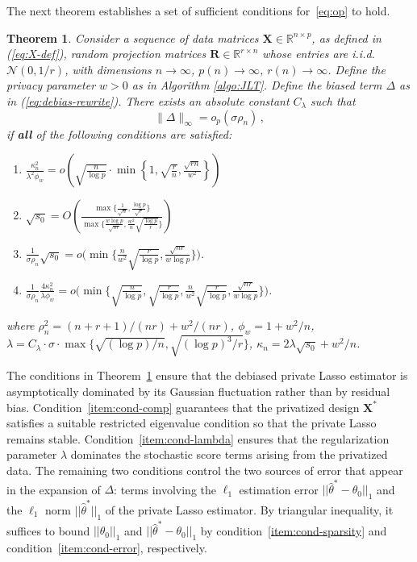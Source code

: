 \documentclass[11pt]{article}
\newtheorem{theorem}{Theorem}%
\newcommand{\bX}{\boldsymbol{X}}
\newcommand{\bR}{\boldsymbol{R}}
\newcommand{\mbR}{\mathbb{R}}
\newcommand{\mcN}{\mathcal{N}}
\begin{document}
The next theorem establishes a set of sufficient conditions for~\eqref{eq:op} to hold.
\begin{theorem}\label{thm:suff-cond-debiasing}
Consider a sequence of data matrices $\bX\in\mbR^{n\times p}$, as defined in (\ref{eq:X-def}), random projection matrices $\bR\in\mbR^{r\times n}$ whose entries are i.i.d. $\mcN(0,1/r)$, with dimensions $n\to\infty$, $p(n)\to\infty$, $r(n)\to \infty$. Define the privacy parameter $w>0$ as in Algorithm \ref{algo:JLT}. Define the biased term $\Delta$ as in (\ref{eq:debias-rewrite}). There exists an absolute constant $C_\lambda$ such that 
\[\|\Delta\|_\infty = o_p(\sigma\rho_n)\,,\] 
if \textbf{all} of the following conditions are satisfied:
    \begin{enumerate}
    \item $\frac{\kappa_n^2}{\lambda^2\phi_w}=o\left(\sqrt{\frac{n}{\log p}}\cdot\min\left\{1,\sqrt{\frac{r}{n}},\frac{\sqrt{rn}}{w^2}\right\}\right)$\label{item:cond-comp}
    \item $\sqrt{s_0} = O\left(\frac{\max\big\{\frac{1}{\sqrt{n}},\frac{\log p }{\sqrt{r}}\big\}}{\max\big\{\frac{w\log p}{\sqrt{nr}},\frac{w^2}{n}\sqrt{\frac{\log p}{r}}\big\}}\right)$\label{item:cond-lambda}
    \item $\frac{1}{\sigma\rho_n}\sqrt{s_0} = o\bigg(\min \bigg\{\frac{n}{w^2}\sqrt{\frac{r}{\log p}},\frac{\sqrt{nr}}{w\log p}\bigg\}\bigg)$.\label{item:cond-sparsity}
    \item $\frac{1}{\sigma\rho_n}\frac{4\kappa_n^2}{\lambda\phi_w} = o\bigg(\min\bigg\{\sqrt{\frac{n}{\log p}},\sqrt{\frac{r}{\log p}},\frac{n}{w^2}\sqrt{\frac{r}{\log p}},\frac{\sqrt{nr}}{w\log p}\bigg\}\bigg)$.\label{item:cond-error}
    \end{enumerate}
     where $\rho_n^2 = (n+r+1)/(nr)+w^2/(nr)$, $\phi_w = 1+w^2/n$, $\lambda =C_\lambda\cdot\sigma\cdot\max\bigg\{\sqrt{(\log p)/n},\sqrt{(\log p)^3/r}\bigg\}$,  $\kappa_n = 2\lambda\sqrt{s_0}+w^2/n$.
\end{theorem}
The conditions in Theorem~\ref{thm:suff-cond-debiasing} ensure that the debiased private Lasso estimator is asymptotically dominated by its Gaussian fluctuation rather than by residual bias. Condition~\ref{item:cond-comp} guarantees that the privatized design $\bX^*$ satisfies a suitable restricted eigenvalue condition so that the private Lasso remains stable. Condition~\ref{item:cond-lambda} ensures that the regularization parameter $\lambda$ dominates the stochastic score terms arising from the privatized data. The remaining two conditions control the two sources of error that appear in the expansion of $\Delta$: terms involving the $\ell_1$ estimation error $||\widehat{\theta}^*-\theta_0||_1$ and the $\ell_1$ norm $||\widehat{\theta}^*||_1$ of the private Lasso estimator. By triangular inequality, it suffices to bound $||\theta_0||_1$ and $||\widehat{\theta}^*-\theta_0||_1$ by condition~\ref{item:cond-sparsity} and condition~\ref{item:cond-error}, respectively. 
 
\end{document}

